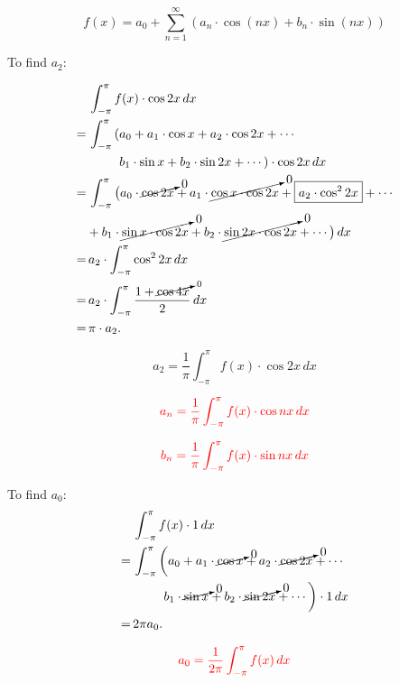 \documentclass[
  letterpaper,
  DIV=11,
  numbers=noendperiod,
  oneside]{scrreprt}
\begin{document}
\[ f(x) = a_0 + \sum_{n=1}^{\infty} \left( a_n \cdot \cos(nx) + b_n \cdot \sin(nx) \right) \]

To find \(a_2\):

\begin{align*}
    &\, \int_{-\pi}^{\pi} f(x) \cdot \cos 2x \,dx \\
    =&\, \int_{-\pi}^{\pi} \left(a_0 + a_1 \cdot \cos x + a_2 \cdot \cos 2x + \cdots\right. \\
    &\, \quad\quad\, \left.b_1 \cdot \sin x + b_2 \cdot \sin 2x + \cdots\right) \cdot \cos 2x \,dx \\
    =&\, \int_{-\pi}^{\pi} \big( a_0 \cdot \cancelto{0}{\cos 2x} + a_1 \cdot \cancelto{0}{\cos x \cdot \cos 2x} + \boxed{a_2 \cdot \cos^2 2x} + \cdots \\
    &+ b_1 \cdot \cancelto{0}{\sin x \cdot \cos 2x} + b_2 \cdot \cancelto{0}{\sin 2x \cdot \cos 2x} + \cdots \big) \,dx \\
    =&\, a_2 \cdot \int_{-\pi}^{\pi} \cos^2 2x \,dx \\
    =&\, a_2 \cdot \int_{-\pi}^{\pi} \frac{1 + \cancelto{0}{\cos 4x}}{2} \,dx \\
    =&\, \pi \cdot a_2 .
\end{align*}

\begin{equation}
    a_2 = \frac{1}{\pi} \int_{-\pi}^{\pi} f(x) \cdot \cos 2x \,dx
\end{equation}

\begin{equation}
    \color{red}{a_n = \frac{1}{\pi} \int_{-\pi}^{\pi} f(x) \cdot \cos nx \,dx}
\end{equation}

\begin{equation}
    \color{red}{b_n = \frac{1}{\pi} \int_{-\pi}^{\pi} f(x) \cdot \sin nx \,dx}
\end{equation}

To find \(a_0\): \begin{align*}
    &\, \int_{-\pi}^{\pi} f(x) \cdot 1 \,dx \\
    =&\, \int_{-\pi}^{\pi} \left(a_0 + a_1 \cdot \cancelto{0}{\cos x} + a_2 \cdot \cancelto{0}{\cos 2x} + \cdots\right. \\
    &\, \quad\quad\, \left.b_1 \cdot \cancelto{0}{\sin x} + b_2 \cdot \cancelto{0}{\sin 2x} + \cdots\right) \cdot 1 \,dx \\
    =&\, 2\pi a_0 .
\end{align*}

\begin{equation}
    \color{red}{a_0 = \frac{1}{2\pi} \int_{-\pi}^{\pi} f(x) \,dx}
\end{equation}
\end{document}
